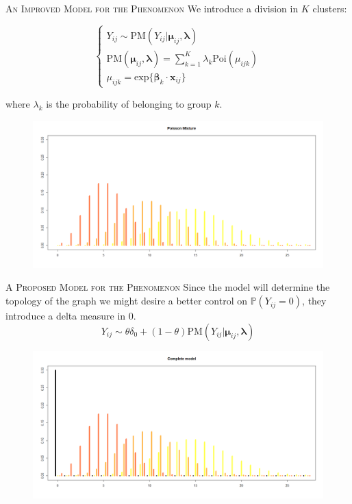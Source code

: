 \documentclass{beamer}
\begin{document}
\begin{frame}{\textsc{An Improved Model for the Phenomenon}}
We introduce a division in \alert{$K$ clusters}:

\begin{equation}
\begin{cases}

Y_{ij} \sim \mathrm{PM}(Y_{ij}|\boldsymbol{\mu}_{ij}, \boldsymbol{\lambda})
\\
\mathrm{PM}(\boldsymbol{\mu}_{ij}, \boldsymbol{\lambda}) = \sum_{k=1}^K \lambda_k\mathrm{Poi}(\mu_{ijk})
\\
\mu_{ijk} = \mathrm{exp}\{\boldsymbol{\beta}_k\cdot \mathbf{x}_{ij}\}
\end{cases}
\end{equation}

where $\lambda_k$ is the probability of belonging to group $k$.
\begin{figure}[H]
	\centering
	\includegraphics[width=0.75\linewidth]{pictures/mod2.png} 
	\label{fig1}
\end{figure}

\end{frame}

\begin{frame}{\textsc{A Proposed Model for the Phenomenon}}
	Since the model will determine the \alert{topology of the graph} we might desire a better \alert{control} on $\mathbb{P}(Y_{ij} = 0)$, they introduce a delta measure in $ 0 $.
	 $$Y_{ij} \sim \theta \delta_{0} + (1 - \theta)\mathrm{PM}(Y_{ij}|\boldsymbol{\mu}_{ij}, \boldsymbol{\lambda})$$
	 \begin{figure}[H]
	 	\centering
	 	\includegraphics[width=1\linewidth]{pictures/mod3.png} 
	 	\label{fig1}
	 \end{figure}
\end{frame}
\end{document}
